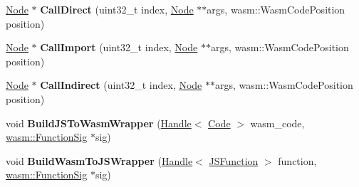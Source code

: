 \begin{DoxyCompactItemize}
\item 
\hyperlink{classv8_1_1internal_1_1compiler_1_1_node}{Node} $\ast$ {\bfseries Call\+Direct} (uint32\+\_\+t index, \hyperlink{classv8_1_1internal_1_1compiler_1_1_node}{Node} $\ast$$\ast$args, wasm\+::\+Wasm\+Code\+Position position)\hypertarget{classv8_1_1internal_1_1compiler_1_1_wasm_graph_builder_ab51cf88c38e193447b63b11d2973af2f}{}\label{classv8_1_1internal_1_1compiler_1_1_wasm_graph_builder_ab51cf88c38e193447b63b11d2973af2f}

\item 
\hyperlink{classv8_1_1internal_1_1compiler_1_1_node}{Node} $\ast$ {\bfseries Call\+Import} (uint32\+\_\+t index, \hyperlink{classv8_1_1internal_1_1compiler_1_1_node}{Node} $\ast$$\ast$args, wasm\+::\+Wasm\+Code\+Position position)\hypertarget{classv8_1_1internal_1_1compiler_1_1_wasm_graph_builder_a0cf7a6760e258bff85ed0aebc713e6b3}{}\label{classv8_1_1internal_1_1compiler_1_1_wasm_graph_builder_a0cf7a6760e258bff85ed0aebc713e6b3}

\item 
\hyperlink{classv8_1_1internal_1_1compiler_1_1_node}{Node} $\ast$ {\bfseries Call\+Indirect} (uint32\+\_\+t index, \hyperlink{classv8_1_1internal_1_1compiler_1_1_node}{Node} $\ast$$\ast$args, wasm\+::\+Wasm\+Code\+Position position)\hypertarget{classv8_1_1internal_1_1compiler_1_1_wasm_graph_builder_af82b6dbc263b93acec27abb6b710f13c}{}\label{classv8_1_1internal_1_1compiler_1_1_wasm_graph_builder_af82b6dbc263b93acec27abb6b710f13c}

\item 
void {\bfseries Build\+J\+S\+To\+Wasm\+Wrapper} (\hyperlink{classv8_1_1internal_1_1_handle}{Handle}$<$ \hyperlink{classv8_1_1internal_1_1_code}{Code} $>$ wasm\+\_\+code, \hyperlink{classv8_1_1internal_1_1_signature}{wasm\+::\+Function\+Sig} $\ast$sig)\hypertarget{classv8_1_1internal_1_1compiler_1_1_wasm_graph_builder_aa4e5b72a447b37da7fbb8771d41d206f}{}\label{classv8_1_1internal_1_1compiler_1_1_wasm_graph_builder_aa4e5b72a447b37da7fbb8771d41d206f}

\item 
void {\bfseries Build\+Wasm\+To\+J\+S\+Wrapper} (\hyperlink{classv8_1_1internal_1_1_handle}{Handle}$<$ \hyperlink{classv8_1_1internal_1_1_j_s_function}{J\+S\+Function} $>$ function, \hyperlink{classv8_1_1internal_1_1_signature}{wasm\+::\+Function\+Sig} $\ast$sig)\hypertarget{classv8_1_1internal_1_1compiler_1_1_wasm_graph_builder_a20318c9c9fe29ccf7881ed052d1bbd39}{}\label{classv8_1_1internal_1_1compiler_1_1_wasm_graph_builder_a20318c9c9fe29ccf7881ed052d1bbd39}


\end{DoxyCompactItemize}
